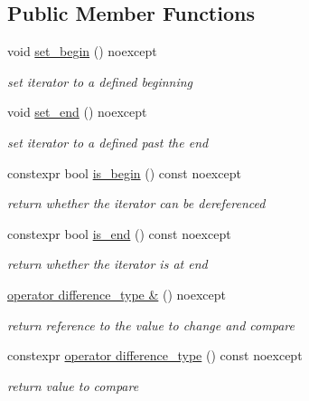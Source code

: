 \subsection*{Public Member Functions}
\begin{DoxyCompactItemize}
\item 
void \hyperlink{classnlohmann_1_1basic__json_1_1primitive__iterator__t_ae16ee263bfa2d496540cc8c4a5bb69c0}{set\+\_\+begin} () noexcept
\begin{DoxyCompactList}\small\item\em set iterator to a defined beginning \end{DoxyCompactList}\item 
void \hyperlink{classnlohmann_1_1basic__json_1_1primitive__iterator__t_a34d8093b7d566a21857a6f8dd4ada5d5}{set\+\_\+end} () noexcept
\begin{DoxyCompactList}\small\item\em set iterator to a defined past the end \end{DoxyCompactList}\item 
constexpr bool \hyperlink{classnlohmann_1_1basic__json_1_1primitive__iterator__t_a5714094a2157c5d28623eb1069217567}{is\+\_\+begin} () const  noexcept
\begin{DoxyCompactList}\small\item\em return whether the iterator can be dereferenced \end{DoxyCompactList}\item 
constexpr bool \hyperlink{classnlohmann_1_1basic__json_1_1primitive__iterator__t_a5e4dffe5a61ca210888d6f867652e2df}{is\+\_\+end} () const  noexcept
\begin{DoxyCompactList}\small\item\em return whether the iterator is at end \end{DoxyCompactList}\item 
\hyperlink{classnlohmann_1_1basic__json_1_1primitive__iterator__t_a451051247c47a686224c3600e28d6d11}{operator difference\+\_\+type \&} () noexcept
\begin{DoxyCompactList}\small\item\em return reference to the value to change and compare \end{DoxyCompactList}\item 
constexpr \hyperlink{classnlohmann_1_1basic__json_1_1primitive__iterator__t_a451091a7648b837a7b2049de06ac335f}{operator difference\+\_\+type} () const  noexcept
\begin{DoxyCompactList}\small\item\em return value to compare \end{DoxyCompactList}\end{DoxyCompactItemize}
